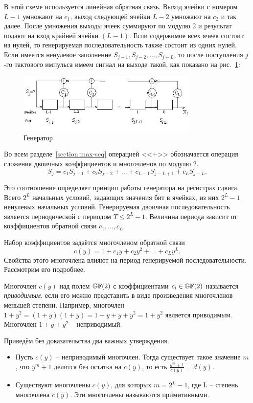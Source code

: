 В этой схеме используется линейная обратная связь. Выход ячейки с номером $L-1$ умножают на $c_{1}$, выход следующей ячейки $L-2$ умножают на $c_2$ и так далее. После умножения выходы ячеек суммируют по модулю 2 и результат подают на вход крайней ячейки $(L-1)$. Если содержимое всех ячеек состоит из нулей, то генерируемая последовательность также состоит из одних нулей. Если имеется ненулевое заполнение $S_{j-1}, S_{j-2}, \dots, S_{j-L}$, то после поступления $j$-го тактового импульса имеем сигнал на выходе такой, как показано на рис.~\ref{fig:generator}:
\begin{figure}[!ht]
	\centering
	\includegraphics[width=0.8\textwidth]{pic/generator}
    \caption{Генератор\label{fig:generator}}
\end{figure}

Во всем разделе~\ref{section:max-seq}  операцией <<$+$>>  обозначается операция сложения двоичных коэффициентов и многочленов по модулю 2.
\[
    S_{j} = c_{1} S_{j-1} + c_{2} S_{j-2} +  \dots  + c_{L-1} S_{j-L+1} + c_{L} S_{j-L}.
\]

Это соотношение определяет принцип работы генератора на регистрах сдвига. Всего $2^{L}$ начальных условий, задающих значения бит в ячейках, из них $2^{L}-1$ ненулевых начальных условий. Генерируемая двоичная последовательность является периодической с периодом $T\leq 2^{L}-1$. Величина периода зависит от коэффициентов обратной связи $c_{1},  \ldots, c_{L} $.

Набор коэффициентов задаётся многочленом обратной связи
    \[ c(y) = 1 + c_1 y+ c_2 y^2 + \dots + c_L y^L. \]
Свойства этого многочлена влияют на период генерируемой последовательности. Рассмотрим его подробнее.

Многочлен $c(y)$ над полем $\mathbb{GF}(2)$ с коэффициентами $c_i \in \mathbb{GF}(2)$ называется \textit{приводимым}, если его можно представить в виде произведения многочленов меньшей степени. Например, многочлен $1 + y^{2} = (1 + y) (1 + y) = 1 + y + y + y^2 = 1 + y^2$ является приводимым. Многочлен $1 + y + y^{2}$ -- неприводимый.

Приведём без доказательства два важных утверждения.
\begin{itemize}
    \item Пусть $c(y)$ -- неприводимый многочлен. Тогда существует такое значение $m$, что $y^{m} + 1$ делится без остатка на $c(y)$, то есть $\frac{y^{m} + 1}{c(y)} = d(y)$.
    \item Существуют многочлены $c(y)$, для которых $m=2^{L} - 1$, где L -- степень многочлена $c(y)$. Эти многочлены называются примитивными.
\end{itemize}

